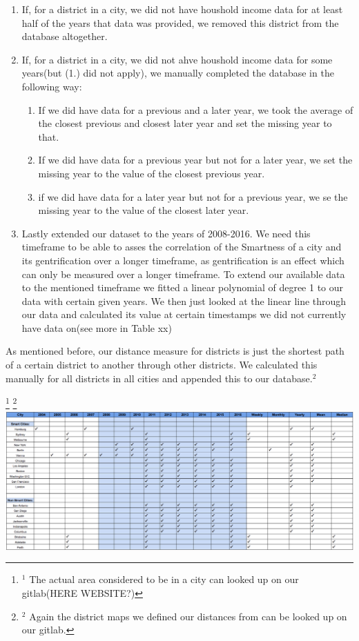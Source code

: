 \documentclass[a4paper, 10pt, conference]{ieeeconf}      %
\begin{document}
\begin{enumerate}
\item If, for a district in a city, we did not have houshold income data for at least half of the years that data was provided, we removed this district from the database altogether. 
\item If, for a district in a city, we did not ahve houshold income data for some years(but (1.) did not apply), we manually completed the database in the following way: 
	\begin{enumerate}
	\item If we did have data for a previous and a later year, we took the average of the closest previous and closest later year and set the missing year to that. 
	\item If we did have data for a previous year but not for a later year, we set the missing year to the value of the closest previous year. 
	\item if we did have data for a later year but not for a previous year, we se the missing year to the value of the closest later year. 
	\end{enumerate}
\item Lastly extended our dataset to the years of 2008-2016. We need this timeframe to be able to asses the correlation of the Smartness of a city and its gentrification over a longer timeframe, as gentrification is an effect which can only be measured over a longer timeframe. To extend our available data to the mentioned timeframe we fitted a linear polynomial of degree 1 to our data with certain given years. We then just looked at the linear line through our data and calculated its value at certain timestamps we did not currently have data on(see more in Table xx)
\end{enumerate}

As mentioned before, our distance measure for districts is just the shortest path of a certain district to another through other 
districts. We calculated this manually for all districts in all cities and appended this to our database.$^{2}$

\thanks{$^{1}$ The actual area considered to be in a city can looked up on our gitlab(HERE WEBSITE?)}
\thanks{$^{2}$ Again the district maps we defined our distances from can be looked up on our gitlab.}
\newpage
\includegraphics[scale=0.6]{"images/data_overview"}
\end{document}
